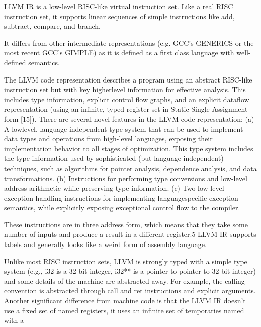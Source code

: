 LLVM IR is a low-level RISC-like virtual instruction set.
Like a real RISC instruction set, it supports linear sequences of simple instructions like add, subtract, compare, and branch.

It differs from other intermediate representations (e.g. GCC's GENERICS or the most recent GCC's GIMPLE) as it is defined as a first class language with well-defined semantics.

The LLVM code representation describes a program using
an abstract RISC-like instruction set but with key higherlevel
information for effective analysis. This includes type
information, explicit control flow graphs, and an explicit
dataflow representation (using an infinite, typed register set
in Static Single Assignment form [15]). There are several
novel features in the LLVM code representation: (a) A lowlevel,
language-independent type system that can be used to
implement data types and operations from high-level languages,
exposing their implementation behavior to all stages
of optimization. This type system includes the type information
used by sophisticated (but language-independent)
techniques, such as algorithms for pointer analysis, dependence
analysis, and data transformations. (b) Instructions
for performing type conversions and low-level address arithmetic
while preserving type information. (c) Two low-level
exception-handling instructions for implementing languagespecific
exception semantics, while explicitly exposing exceptional
control flow to the compiler.


These instructions are in three address form, which means that they take some number of inputs and produce a result in a different register.5 LLVM IR supports labels and generally looks like a weird form of assembly language.

Unlike most RISC instruction sets, LLVM is strongly typed with a simple type system (e.g., i32 is a 32-bit integer, i32** is a pointer to pointer to 32-bit integer) and some details of the machine are abstracted away. For example, the calling convention is abstracted through call and ret instructions and explicit arguments. Another significant difference from machine code is that the LLVM IR doesn't use a fixed set of named registers, it uses an infinite set of temporaries named with a %


